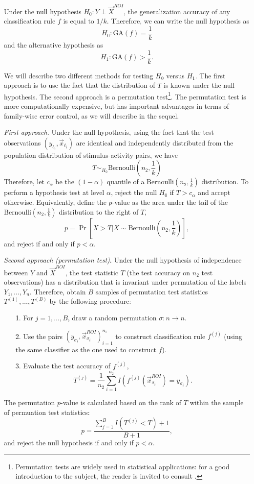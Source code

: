 Under the null hypothesis $H_0: Y \perp \vec{X}^{ROI}$, the
generalization accuracy of any classification rule $f$ is equal to
$1/k$.  Therefore, we can write the null hypothesis as
\[
H_0: \text{GA}(f) = \frac{1}{k}
\]
and the alternative hypothesis as
\[
H_1: \text{GA}(f) > \frac{1}{k}.
\]

We will describe two different methods for testing $H_0$ versus $H_1$.
The first approach is to use the fact that the distribution of $T$ is
known under the null hypothesis.  The second approach is a permutation
test\footnote{Permutation tests are
widely used in statistical applications: for a good introduction to
the subject, the reader is invited to consult
\cite{efron1994introduction}.}.  The permutation test is more computationally expensive, but has
important advantages in terms of family-wise error control, as we will
describe in the sequel. %

\emph{First approach.} Under the null hypothesis, using the fact that
the test observations $(y_{\ell_i}, \vec{x}_{\ell_i})$ are identical
and independently distributed from the population distribution of
stimulus-activity pairs, we have
\[
T \sim_{H_0} \text{Bernoulli}(n_2, \frac{1}{k})
\]
Therefore, let $c_\alpha$ be the $(1-\alpha)$ quantile of a
$\text{Bernoulli}(n_2, \frac{1}{k})$ distribution.  To perform a
hypothesis test at level $\alpha$, reject the null $H_0$ if $T >
c_\alpha$ and accept otherwise.  Equivalently, define the $p$-value as
the area under the tail of the $\text{Bernoulli}(n_2,
\frac{1}{k})$ distribution to the right of $T$,
\[
p = \Pr[X > T| X \sim \text{Bernoulli}(n_2, \frac{1}{k})],
\]
and reject if and only if $p < \alpha$.

\emph{Second approach (permutation test)}.  Under the null hypothesis of
independence between $Y$ and $\vec{X}^{ROI}$, the test statistic $T$
(the test accuracy on $n_2$ test observations) has a distribution that
is invariant under permutation of the labels $Y_1,\hdots, Y_n$.
Therefore, obtain $B$ samples of permutation test statistics
$T^{(1)},\hdots, T^{(B)}$ by the following procedure:
\begin{itemize}
\item[1.] For $j = 1,\hdots, B$, draw a random permutation $\sigma: n \to n$.
\item[2.] Use the pairs
  $(y_{\sigma_i},\vec{x}^{ROI}_{\sigma_i})_{i=1}^{n_1}$ to construct
  classification rule $f^{(j)}$ (using the same classifier as the one
  used to construct $f$).
\item[3.] Evaluate the test accuracy of $f^{(j)}$,
\[
T^{(j)}= \frac{1}{n_2} \sum_{i=1}^{n_2} I(f^{(j)}(\vec{x}_{\sigma_i}^{ROI}) = y_{\sigma_i}).
\]
\end{itemize}
The permutation $p$-value is calculated based on the rank of $T$ within the sample of permuation test statistics:
\[
p = \frac{\sum_{j=1}^B I(T^{(j)} < T) + 1}{B + 1},
\]
and reject the null hypothesis if and only if $p < \alpha$.

